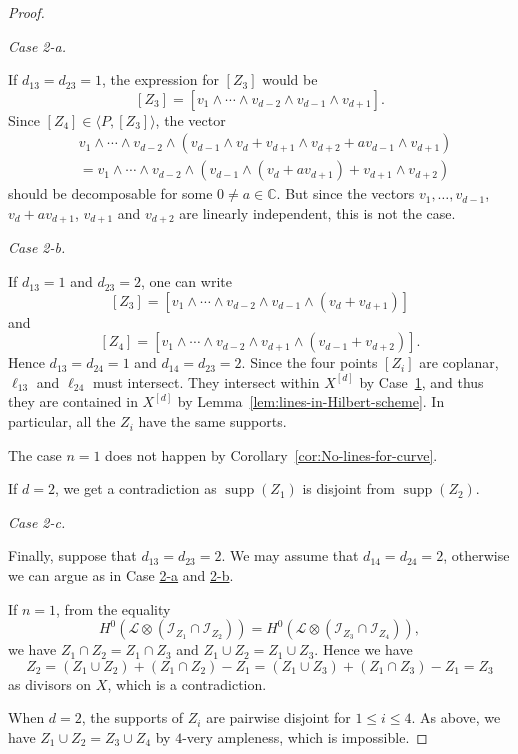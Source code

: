 \documentclass[10pt,a4paper]{amsart}
\def \CC {\mathbb{C}}
\def \Ical {\mathcal{I}}
\def \Lcal {\mathcal{L}}
\DeclareMathOperator{\supp}{supp}
\begin{document}
\begin{proof}
\hypertarget{Case1-2-a}{\textit{Case 2-a.}} If $d_{13} = d_{23} = 1$, the expression for $[Z_3]$ would be
 \[
  [Z_3] = [v_1 \wedge \cdots \wedge v_{d-2} \wedge v_{d-1} \wedge v_{d+1}].
 \]
Since $[Z_4] \in \langle P, [Z_3] \rangle$, the vector
 \begin{align*}
  &v_1 \wedge \cdots \wedge v_{d-2} \wedge (v_{d-1} \wedge v_d + v_{d+1} \wedge v_{d+2} + av_{d-1} \wedge v_{d+1}) \\
  &= v_1 \wedge \cdots \wedge v_{d-2} \wedge (v_{d-1} \wedge (v_d + av_{d+1}) + v_{d+1} \wedge v_{d+2})
 \end{align*}
should be decomposable for some $0 \neq a \in \CC$.
But since the vectors $v_1, \dots, v_{d-1}$, $v_{d}+av_{d+1}$, $v_{d+1}$ and $v_{d+2}$ are linearly independent, this is not the case.

\hypertarget{Case1-2-b}{\textit{Case 2-b.}} If $d_{13} = 1$ and $d_{23} = 2$, one can write
 \[
  [Z_3] = [v_1 \wedge \cdots \wedge v_{d-2} \wedge v_{d-1} \wedge (v_{d} + v_{d+1})]
 \]
and
 \[
  [Z_4] = [v_1 \wedge \cdots \wedge v_{d-2} \wedge v_{d+1} \wedge (v_{d-1} + v_{d+2})].
 \]
Hence $d_{13} = d_{24} = 1$ and $d_{14} = d_{23} = 2$.
Since the four points $[Z_i]$ are coplanar, $\ell_{13}$ and $\ell_{24}$ must intersect.
They intersect within $X^{[d]}$ by Case~\hyperlink{Case1-1}{1}, and thus they are contained in $X^{[d]}$ by Lemma~\ref{lem:lines-in-Hilbert-scheme}.
In particular, all the $Z_i$ have the same supports.

The case $n = 1$ does not happen by Corollary~\ref{cor:No-lines-for-curve}.

If $d = 2$, we get a contradiction as $\supp(Z_1)$ is disjoint from $\supp(Z_2)$.

\hypertarget{Case1-2-c}{\textit{Case 2-c.}} Finally, suppose that $d_{13} = d_{23} = 2$.
We may assume that $d_{14} = d_{24} = 2$, otherwise we can argue as in Case \hyperlink{Case1-2-a}{2-a} and \hyperlink{Case1-2-b}{2-b}.

If $n=1$, from the equality
 \[
  H^0(\Lcal \otimes (\Ical_{Z_1} \cap \Ical_{Z_2})) = H^0(\Lcal \otimes (\Ical_{Z_3} \cap \Ical_{Z_4})),
 \]
we have $Z_1 \cap Z_2 = Z_1 \cap Z_3$ and $Z_1 \cup Z_2 = Z_1 \cup Z_3$.
Hence we have
 \[
  Z_2 = (Z_1 \cup Z_2) + (Z_1 \cap Z_2) - Z_1 = (Z_1 \cup Z_3) + (Z_1 \cap Z_3) - Z_1 = Z_3
 \]
as divisors on $X$, which is a contradiction.

When $d = 2$, the supports of $Z_i$ are pairwise disjoint for $1 \leq i \leq 4$.
As above, we have $Z_1 \cup Z_2 = Z_3 \cup Z_4$ by $4$-very ampleness, which is impossible.
\end{proof}
\end{document}
